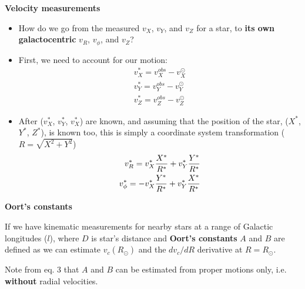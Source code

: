 \documentclass[letterpaper,landscape]{slides}
\begin{document}
\begin{slide}

\begin{center}
\bfseries
\large {} Velocity measurements 
\end{center}
\vskip 0.2in
\begin{itemize}
\item How do we go from the measured $v_X$, $v_Y$, and $v_Z$ for
a star, to {\bf its own galactocentric} $v_R$, $v_\phi$, and $v_Z$? 
\item First, we need to account for our motion:
\begin{eqnarray} 
           v_X^\ast = v_X^{obs} - v_X^\odot  \nonumber \\
           v_Y^\ast = v_Y^{obs} - v_Y^\odot  \nonumber \\
           v_Z^\ast = v_Z^{obs} - v_Z^\odot  \nonumber   
\end{eqnarray} 
\item After ($v_X^\ast$, $v_Y^\ast$, $v_X^\ast$) are known, and assuming
that the position of the star, ($X^\ast$, $Y^\ast$, $Z^\ast$), is known 
too, this is simply a coordinate system transformation ($R=\sqrt{X^2+Y^2}$)
\begin{eqnarray} 
    v_R^\ast = v_X^\ast {X^\ast \over R^\ast} + v_Y^\ast {Y^\ast \over R^\ast}  \nonumber \\
  v_\phi^\ast = -v_X^\ast {Y^\ast \over R^\ast} + v_Y^\ast {X^\ast \over R^\ast}  \nonumber 
\end{eqnarray} 
\end{itemize}    
\vfill
\end{slide}


\begin{slide}
\begin{center}
\bfseries
\large {} Oort's constants 
\end{center}
\vskip 0.2in

If we have kinematic measurements for nearby stars at a range of Galactic longitudes ($l$),
where $D$ is star's distance and {\bf Oort's constants} $A$ and $B$ are defined as
we can estimate $v_c(R_\odot)$ and the $dv_c/dR$ derivative at $R=R_\odot$. 

Note from eq. 3 that $A$ and $B$ can be estimated from proper motions only, i.e. {\bf without} radial velocities.
\vfill
\end{slide}
\end{document}
